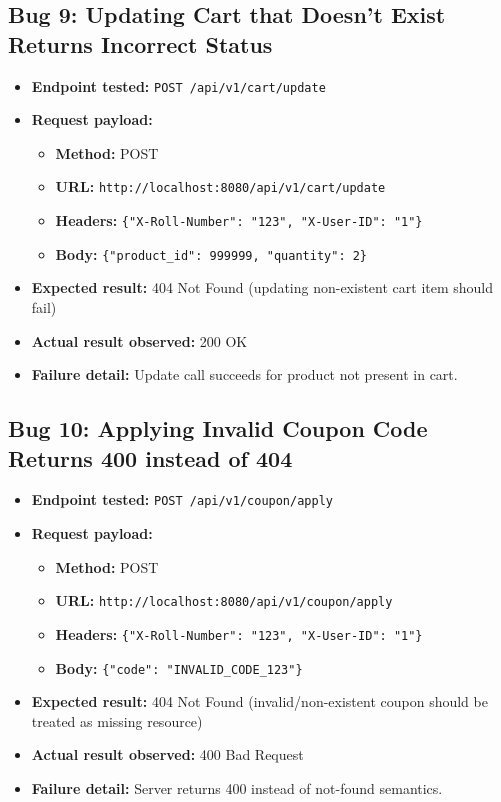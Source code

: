 ﻿\documentclass[11pt,a4paper]{article}
\begin{document}
\subsection*{Bug 9: Updating Cart that Doesn't Exist Returns Incorrect Status}
\begin{itemize}
  \item \textbf{Endpoint tested:} \texttt{POST /api/v1/cart/update}
  \item \textbf{Request payload:}
  \begin{itemize}
    \item \textbf{Method:} POST
    \item \textbf{URL:} \texttt{http://localhost:8080/api/v1/cart/update}
    \item \textbf{Headers:} \texttt{\{"X-Roll-Number": "123", "X-User-ID": "1"\}}
    \item \textbf{Body:} \texttt{\{"product_id": 999999, "quantity": 2\}}
  \end{itemize}
  \item \textbf{Expected result:} 404 Not Found (updating non-existent cart item should fail)
  \item \textbf{Actual result observed:} 200 OK
  \item \textbf{Failure detail:} Update call succeeds for product not present in cart.
\end{itemize}

\subsection*{Bug 10: Applying Invalid Coupon Code Returns 400 instead of 404}
\begin{itemize}
  \item \textbf{Endpoint tested:} \texttt{POST /api/v1/coupon/apply}
  \item \textbf{Request payload:}
  \begin{itemize}
    \item \textbf{Method:} POST
    \item \textbf{URL:} \texttt{http://localhost:8080/api/v1/coupon/apply}
    \item \textbf{Headers:} \texttt{\{"X-Roll-Number": "123", "X-User-ID": "1"\}}
    \item \textbf{Body:} \texttt{\{"code": "INVALID_CODE_123"\}}
  \end{itemize}
  \item \textbf{Expected result:} 404 Not Found (invalid/non-existent coupon should be treated as missing resource)
  \item \textbf{Actual result observed:} 400 Bad Request
  \item \textbf{Failure detail:} Server returns 400 instead of not-found semantics.
\end{itemize}
\end{document}
